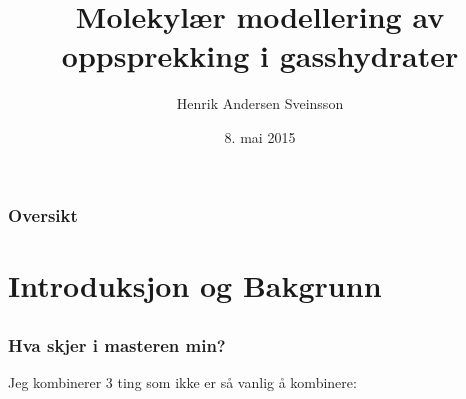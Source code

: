 \documentclass[utf8x, notes, graphics]{beamer}
\title{Molekylær modellering av oppsprekking i gasshydrater}
\author{Henrik Andersen Sveinsson}
\institute[Universitetet i Oslo] %
{ Fysisk institutt\\
Det matematisk-naturvitenskapelige fakultet \\
Universitetet i Oslo
}
\date{8. mai 2015}
\begin{document}
\begin{frame}
	\titlepage
\end{frame}

\begin{frame}
\frametitle{Oversikt}
\tableofcontents
\end{frame}

\section[Introduksjon]{Introduksjon og Bakgrunn}

\subsection{}

\begin{frame}
\frametitle{Hva skjer i masteren min?}
Jeg kombinerer 3 ting som ikke er så vanlig å kombinere:

\end{frame}
\end{document}
